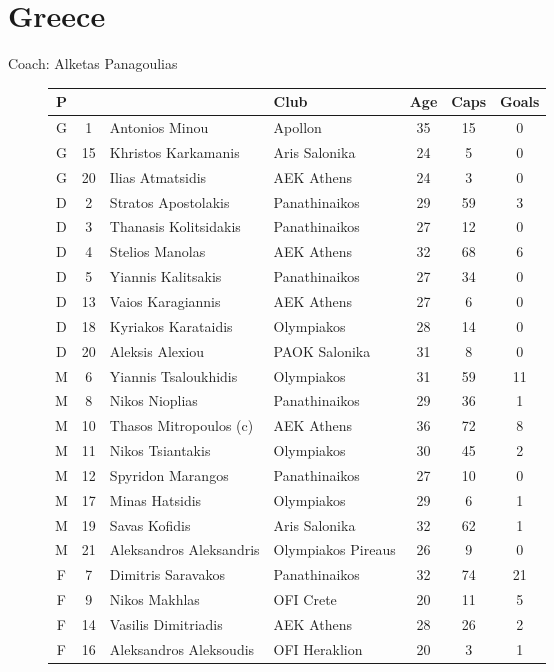 \chapter{Greece}
\newline
\newline
Coach: Alketas Panagoulias
\begin{figure}[H]
\begin{tabular}{c c l l c c c}
P & & & Club & Age & Caps & Goals \\ \hline
G & 1 & Antonios Minou & Apollon & 35 & 15 & 0 \\
G & 15 & Khristos Karkamanis & Aris Salonika & 24 & 5 & 0 \\
G & 20 & Ilias Atmatsidis & AEK Athens &  24 & 3 & 0 \\ \hline
D &  2 & Stratos Apostolakis & Panathinaikos & 29 & 59 & 3 \\
D &  3 & Thanasis Kolitsidakis & Panathinaikos & 27 & 12 & 0 \\
D &  4 & Stelios Manolas & AEK Athens & 32 & 68 & 6 \\
D &  5 & Yiannis Kalitsakis & Panathinaikos & 27 & 34 & 0 \\
D & 13 & Vaios Karagiannis & AEK Athens & 27 & 6 & 0 \\
D & 18 & Kyriakos Karataidis & Olympiakos & 28 & 14 & 0 \\
D & 20 & Aleksis Alexiou & PAOK Salonika & 31 & 8 & 0 \\ \hline
M &  6 & Yiannis Tsaloukhidis & Olympiakos & 31 & 59 & 11 \\
M &  8 & Nikos Nioplias & Panathinaikos & 29 & 36 & 1 \\
M & 10 & Thasos Mitropoulos (c) & AEK Athens & 36 & 72 & 8 \\
M & 11 & Nikos Tsiantakis & Olympiakos & 30 & 45 & 2 \\
M & 12 & Spyridon Marangos & Panathinaikos & 27 & 10 & 0 \\
M & 17 & Minas Hatsidis & Olympiakos & 29 & 6 & 1 \\
M & 19 & Savas Kofidis & Aris Salonika & 32 & 62 & 1 \\
M & 21 & Aleksandros Aleksandris & Olympiakos Pireaus & 26 & 9 & 0 \\ \hline
F &  7 & Dimitris Saravakos & Panathinaikos & 32 & 74 & 21 \\
F &  9 & Nikos Makhlas & OFI Crete & 20 & 11 & 5 \\
F & 14 & Vasilis Dimitriadis & AEK Athens & 28 & 26 & 2 \\
F & 16 & Aleksandros Aleksoudis & OFI Heraklion & 20 & 3 & 1 \\ \hline
\end{tabular}
\end{figure}
